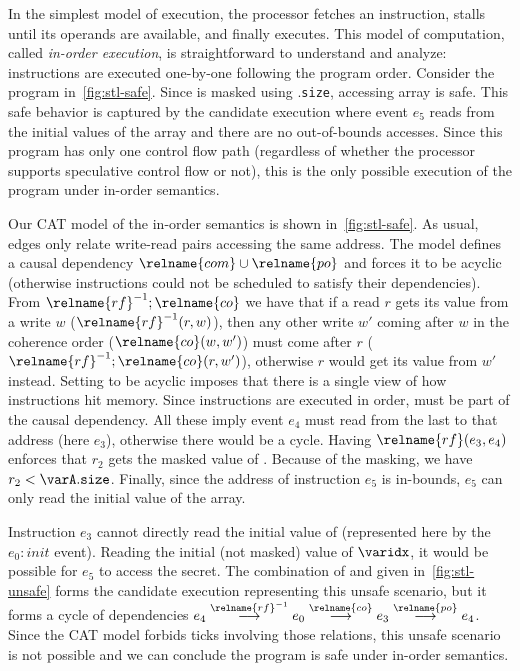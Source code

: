 \documentclass[conference]{IEEEtran}
\begin{document}
In the simplest model of execution, the processor fetches an instruction, stalls until its operands are available, and finally executes.
This model of computation, called \emph{in-order execution}, is straightforward to understand and analyze: instructions are executed one-by-one following the program order.
Consider the program in~\autoref{fig:stl-safe}. 
Since \varidx is masked using \varA.\texttt{size}, accessing array \varA is safe.
This safe behavior is captured by the candidate execution where event $e_5$ reads from the initial values of the array and there are no out-of-bounds accesses.
Since this program has only one control flow path (regardless of whether the processor supports speculative control flow or not), this is the only possible execution of the program under in-order semantics.

Our CAT model of the in-order semantics is shown in~\autoref{fig:stl-safe}.
As usual,  edges only relate write-read pairs accessing the same address.
The model defines a causal dependency $\relname{com} \cup \relname{po}$ and forces it to be acyclic (otherwise instructions could not be scheduled to satisfy their dependencies).
From $\relname{rf}^{-1};\relname{co}$ we have that if a read $r$ gets its value from a write $w$ ($\relname{rf}^{-1}(r,w)$), then any other write $w'$ coming after $w$ in the coherence order ($\relname{co}(w,w')$) must come after $r$ ($\relname{rf}^{-1};\relname{co}(r,w')$), otherwise $r$ would get its value from $w'$ instead.
Setting  to be acyclic imposes that there is a single view of how instructions hit memory.
Since instructions are executed in order,  must be part of the causal dependency.
All these imply event $e_4$ must read from the last \store to that address (here $e_3$), otherwise there would be a cycle.
Having $\relname{rf}(e_3,e_4)$ enforces that $r_2$ gets the masked value of \varidx.
Because of the masking, we have $r_2 < \varA.\texttt{size}$.
Finally, since the address of instruction $e_5$ is in-bounds, $e_5$ can only read the initial value of the array.

Instruction $e_3$ cannot directly read the initial value of \varidx (represented here by the $e_0: \mathit{init}$ event).
Reading the initial (not masked) value of $\varidx$, it would be possible for $e_5$ to access the secret.
The combination of  and  given in~\autoref{fig:stl-unsafe} forms the candidate execution representing this unsafe scenario, but it forms a cycle of dependencies $e_4 \stackrel{\relname{\scriptsize rf}^{-1}}{\longrightarrow} e_0 \stackrel{\relname{\scriptsize co}}{\longrightarrow} e_3 \stackrel{\relname{\scriptsize po}}{\longrightarrow} e_4$.
Since the CAT model forbids ticks involving those relations, this unsafe scenario is not possible and we can conclude the program is safe under in-order semantics.
\end{document}
